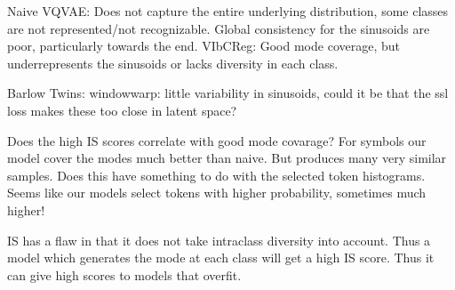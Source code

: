 \documentclass[../../thesis.tex]{subfiles}
\begin{document}
Naive VQVAE: Does not capture the entire underlying distribution, some classes are not represented/not recognizable. Global consistency for the sinusoids are poor, particularly towards the end.
 \newline
VIbCReg: Good mode coverage, but underrepresents the sinusoids or lacks diversity in each class. 

Barlow Twins: windowwarp: little variability in sinusoids, could it be that the ssl loss makes these too close in latent space?

Does the high IS scores correlate with good mode covarage? For symbols our model cover the modes much better than naive. But produces many very similar samples. Does this have something to do with the selected token histograms. Seems like our models select tokens with higher probability, sometimes much higher!\newline

IS has a flaw in that it does not take intraclass diversity into account. Thus a model which generates the mode at each class will get a high IS score. Thus it can give high scores to models that overfit.  
\end{document}
